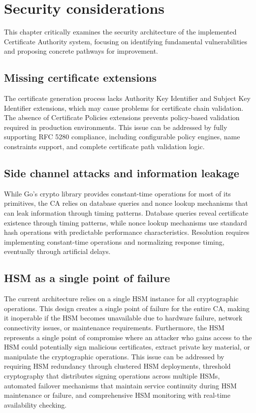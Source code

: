 \chapter{Security considerations}

This chapter critically examines the security architecture of the implemented Certificate 
Authority system, focusing on identifying fundamental vulnerabilities and proposing 
concrete pathways for improvement.


\section{Missing certificate extensions}

The certificate generation process lacks Authority Key Identifier and Subject Key Identifier extensions,
which may cause problems for certificate chain validation. The absence of Certificate Policies extensions 
prevents policy-based validation required in production environments.
This issue can be addressed by fully supporting RFC 5280 \cite{rfc5280} compliance, 
including configurable policy engines, name constraints support, and complete certificate path 
validation logic.


\section{Side channel attacks and information leakage}

While Go's crypto library provides constant-time operations for most of its primitives, the CA
relies on database queries and nonce lookup mechanisms that can leak information through timing
patterns. 
Database queries reveal certificate existence through timing patterns, while nonce lookup mechanisms 
use standard hash operations with predictable performance characteristics.
Resolution requires implementing constant-time operations and normalizing response timing, eventually through 
artificial delays.


\section{HSM as a single point of failure}

The current architecture relies on a single HSM instance for all cryptographic operations. 
This design creates a single point of failure for the entire CA, making it inoperable if the HSM 
becomes unavailable due to hardware failure, network connectivity issues, or maintenance requirements.
Furthermore, the HSM represents a single point of compromise where an attacker who gains access to 
the HSM could potentially sign malicious certificates, extract private key material, or manipulate 
the cryptographic operations. 
This issue can be addressed by requiring HSM redundancy through clustered HSM deployments, threshold 
cryptography that distributes signing operations across multiple HSMs, automated failover mechanisms 
that maintain service continuity during HSM maintenance or failure, and comprehensive HSM monitoring 
with real-time availability checking. 

